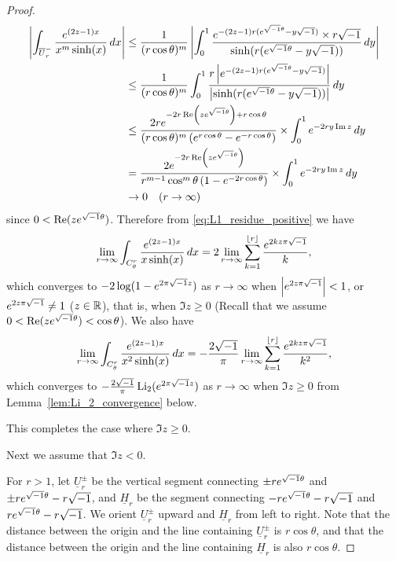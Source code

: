 \begin{proof}
\begin{equation*}
\begin{split}
  \left|
    \int_{\overline{U}_r^{-}}\frac{e^{(2z-1)x}}{x^m\sinh(x)}\,dx
  \right|
  &\le
  \frac{1}{(r\cos\theta)^m}
  \left|
    \int_{0}^{1}\frac{e^{-(2z-1)r(e^{\sqrt{-1}\theta}-y\sqrt{-1})}\times r\sqrt{-1}}{\sinh(r(e^{\sqrt{-1}\theta}-y\sqrt{-1}))}\,dy
  \right|
  \\
  &\le
  \frac{1}{(r\cos\theta)^m}
  \int_{0}^{1}
  \frac{r\left|e^{-(2z-1)r(e^{\sqrt{-1}\theta}-y\sqrt{-1})}\right|}{\left|\sinh(r(e^{\sqrt{-1}\theta}-y\sqrt{-1}))\right|}\,dy
  \\
  &\le
  \frac{2re^{-2r\operatorname{Re}\left(ze^{\sqrt{-1}\theta}\right)+r\cos\theta}}
       {(r\cos\theta)^m\left(e^{r\cos\theta}-e^{-r\cos\theta}\right)}
  \times
  \int_{0}^{1}e^{-2ry\operatorname{Im}{z}}\,dy
  \\
  &=
  \frac{2e^{-2r\operatorname{Re}\left(ze^{\sqrt{-1}\theta}\right)}}
       {r^{m-1}\cos^m\theta\left(1-e^{-2r\cos\theta}\right)}
  \times
  \int_{0}^{1}e^{-2ry\operatorname{Im}{z}}\,dy
  \\
  &\to0\quad(r\to\infty)
\end{split}
\end{equation*}
since $0<\operatorname{Re}(ze^{\sqrt{-1}\theta})$.
Therefore from \eqref{eq:L1_residue_positive} we have
\begin{equation*}
  \lim_{r\to\infty}
  \int_{C_{\theta}^{r}}\frac{e^{(2z-1)x}}{x\sinh(x)}\,dx
  =
  2
  \lim_{r\to\infty}
  \sum_{k=1}^{\lfloor{r}\rfloor}\frac{e^{2kz\pi\sqrt{-1}}}{k},
\end{equation*}
which converges to $-2\log(1-e^{2\pi\sqrt{-1} z})$ as $r\to\infty$ when $\left|e^{2z\pi\sqrt{-1}}\right|<1$, or $e^{2z\pi\sqrt{-1}}\ne1$ ($z\in\mathbb{R}$), that is, when $\Im{z}\ge0$ (Recall that we assume $0<\operatorname{Re}(ze^{\sqrt{-1}\theta})<\cos\theta$).
We also have
\begin{equation*}
  \lim_{r\to\infty}
  \int_{C_{\theta}^{r}}\frac{e^{(2z-1)x}}{x^2\sinh(x)}\,dx
  =
  -\frac{2\sqrt{-1}}{\pi}
  \lim_{r\to\infty}
  \sum_{k=1}^{\lfloor{r}\rfloor}\frac{e^{2kz\pi\sqrt{-1}}}{k^2},
\end{equation*}
which converges to $-\frac{2\sqrt{-1}}{\pi}\operatorname{Li}_2(e^{2\pi\sqrt{-1} z})$ as $r\to\infty$ when $\Im{z}\ge0$ from Lemma~\ref{lem:Li_2_convergence} below.
\par
This completes the case where $\Im{z}\ge0$.
\par
Next we assume that $\Im{z}<0$.
\par
For $r>1$, let $\underline{U}_{r}^{\pm}$ be the vertical segment connecting $\pm re^{\sqrt{-1}\theta}$ and $\pm re^{\sqrt{-1}\theta}-r\sqrt{-1}$, and $\underline{H}_{r}$ be the segment connecting $-re^{\sqrt{-1}\theta}-r\sqrt{-1}$ and $re^{\sqrt{-1}\theta}-r\sqrt{-1}$.
We orient $\underline{U}_{r}^{\pm}$ upward and $\underline{H}_{r}$ from left to right.
Note that the distance between the origin and the line containing $\underline{U}_{r}^{\pm}$ is $r\cos\theta$, and that the distance between the origin and the line containing $\underline{H}_{r}$ is also $r\cos\theta$.

\end{proof}
